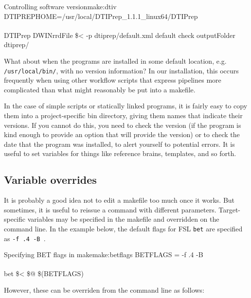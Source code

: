 \begin{make}{Controlling software version}{make:dtiv}
	DTIPREPHOME=/usr/local/DTIPrep_1.1.1_linux64/DTIPrep \\
	
	 \\
	\tab DTIPrep \dd DWINrrdFile \$< -p dtiprep/default.xml \dd default \dd check \dd outputFolder dtiprep/ \\	
\end{make}

What about when the programs are installed in some default location, e.g. \texttt{/usr/local/bin/}, with no version information? In our installation, this occurs frequently when using other workflow scripts that express pipelines more complicated than what might reasonably be put into a makefile.

In the case of simple scripts or statically linked programs, it is fairly easy to copy them into a project-specific bin directory, giving them names that indicate their versions. If you cannot do this, you need to check the version (if the program is kind enough to provide an option that will provide the version) or to check the date that the program was installed, to alert yourself to potential errors. It is useful to set variables for things like reference brains, templates, and so forth. 

\subsection{Variable overrides}
It is probably a good idea not to edit a makefile too much once it works. But sometimes, it is useful to reissue a command with different parameters. Target-specific variables may be specified in the makefile and overridden on the command line. In the example below, the default flags for FSL \texttt{bet} are specified as \texttt{-f .4 -B }.

\begin{make}{Specifying BET flags in make}{make:betflags}
	BETFLAGS = -f .4 -B \\
	 \\
	\tab bet \$< \$@ \$(BETFLAGS) \\
\end{make}

However, these can be overriden from the command line as follows:


